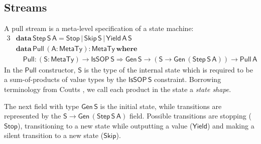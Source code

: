 \documentclass[acmsmall,screen,review,anonymous]{acmart}
\newcommand{\msf}[1]{{\mathsf{#1}}}
\newcommand{\mbf}[1]{{\mathbf{#1}}}
\newcommand{\ind}{\hspace{1em}}
\newcommand{\data}{\mbf{data}\,}
\newcommand{\where}{\mbf{where}}
\newcommand{\vA}{\mathsf{A}}
\newcommand{\vS}{\mathsf{S}}
\newcommand{\IsSOP}{\msf{IsSOP}}
\newcommand{\MTy}{\msf{MetaTy}}
\theoremstyle{remark}
\newcommand{\Gen}{\msf{Gen}}
\newcommand{\RA}{\Rightarrow}
\newcommand{\Stop}{\msf{Stop}}
\newcommand{\Skip}{\msf{Skip}}
\newcommand{\Yield}{\msf{Yield}}
\newcommand{\Step}{\msf{Step}}
\newcommand{\Pull}{\msf{Pull}}
\begin{document}
\subsection{Streams}

A pull stream is a meta-level specification of a state machine:
\begin{alignat*}{3}
  & \data \Step\,\vS\,\vA = \Stop\,|\,\Skip\,\vS\,|\,\Yield\,\vA\,\vS\\
  & \data \Pull\,(\vA : \MTy) : \MTy\,\where\\
  & \ind \Pull : (\vS : \MTy) \to \IsSOP\,\vS \RA \Gen\,\vS \to (\vS \to \Gen\,(\Step\,\vS\,\vA)) \to \Pull\,\vA
\end{alignat*}
In the $\Pull$ constructor, $\vS$ is the type of the internal state which is
required to be a sum-of-products of value types by the $\IsSOP\,\vS$
constraint. Borrowing terminology from Coutts \cite{DBLP:phd/ethos/Coutts11}, we
call each product in the state a \emph{state shape}.

The next field with type $\Gen\,\vS$ is the initial state, while transitions
are represented by the $\vS \to \Gen\,(\Step\,\vS\,\vA)$ field. Possible transitions
are stopping ($\Stop$), transitioning to a new state while outputting a value
($\Yield$) and making a silent transition to a new state ($\Skip$).
\end{document}
